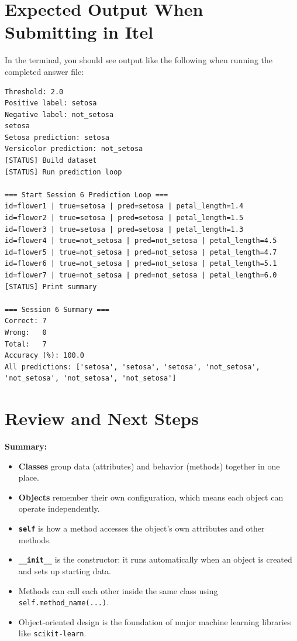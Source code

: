 \section{Expected Output When Submitting in Itel}

In the terminal, you should see output like the following when running the completed answer file:
\begin{verbatim}
Threshold: 2.0
Positive label: setosa
Negative label: not_setosa
setosa
Setosa prediction: setosa
Versicolor prediction: not_setosa
[STATUS] Build dataset
[STATUS] Run prediction loop

=== Start Session 6 Prediction Loop ===
id=flower1 | true=setosa | pred=setosa | petal_length=1.4
id=flower2 | true=setosa | pred=setosa | petal_length=1.5
id=flower3 | true=setosa | pred=setosa | petal_length=1.3
id=flower4 | true=not_setosa | pred=not_setosa | petal_length=4.5
id=flower5 | true=not_setosa | pred=not_setosa | petal_length=4.7
id=flower6 | true=not_setosa | pred=not_setosa | petal_length=5.1
id=flower7 | true=not_setosa | pred=not_setosa | petal_length=6.0
[STATUS] Print summary

=== Session 6 Summary ===
Correct: 7
Wrong:   0
Total:   7
Accuracy (%): 100.0
All predictions: ['setosa', 'setosa', 'setosa', 'not_setosa', 'not_setosa', 'not_setosa', 'not_setosa']
\end{verbatim}

\section{Review and Next Steps}

\textbf{Summary:}
\begin{itemize}
    \item \textbf{Classes} group data (attributes) and behavior (methods) together in one place.
    \item \textbf{Objects} remember their own configuration, which means each object can operate independently.
    \item \textbf{\texttt{self}} is how a method accesses the object's own attributes and other methods.
    \item \textbf{\texttt{\_\_init\_\_}} is the constructor: it runs automatically when an object is created and sets up starting data.
    \item Methods can call each other inside the same class using \texttt{self.method\_name(...)}.
    \item Object-oriented design is the foundation of major machine learning libraries like \texttt{scikit-learn}.
\end{itemize}

